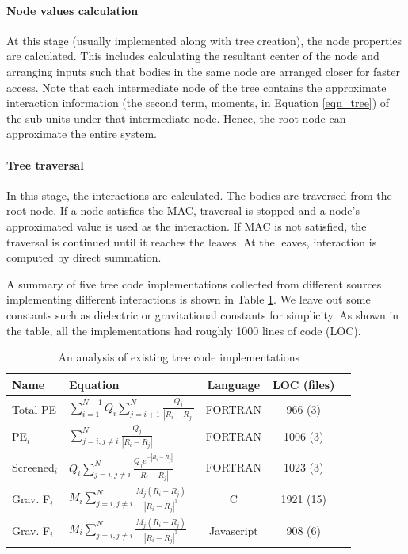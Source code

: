 \documentclass[draftclsnofoot]{elsarticle}
\begin{document}
\paragraph{Node values calculation}
At this stage (usually implemented along with tree creation), the node  properties are calculated. This includes calculating the resultant center of the node and arranging 
inputs such that bodies in the same node are arranged closer for faster access. Note that each intermediate node of the tree contains the approximate interaction 
information (the second term, moments, in Equation \ref{eqn_tree}) of the sub-units under that intermediate node.  Hence, the root node can approximate the entire system. 
 
\paragraph{Tree traversal}
In this stage, the interactions are calculated. The bodies are traversed from the root node. If a node satisfies the MAC, traversal is stopped and a node's approximated value
is used as the interaction. If MAC is not satisfied, the traversal is continued until it reaches the leaves. At the leaves, interaction is computed by direct summation.

A summary of five tree code implementations collected from different sources \cite{code1,code2, code3} implementing different
interactions is shown in  Table \ref{tbl_treecodes}. We leave out some constants such as dielectric or gravitational constants for simplicity.
As shown in the table, all the implementations had roughly 1000 lines of code (LOC).  

\begin{table}[!t]
\caption{An analysis of existing tree code implementations}
\label{tbl_treecodes}
\centering
\begin{tabular}{|l|l|c|c|c|}
\hline
Name & Equation & Language & LOC (files) \\
\hline \hline
Total PE
 & $\sum \limits_{i=1}^{N-1} Q_i\sum \limits_{j=i+1}^{N} \frac{Q_j}{|R_i-R_j|}$ & FORTRAN & 966 (3) \\
PE$_i$ &       $  \sum \limits_{j=i, j\ne i}^{N} \frac{Q_j}{|R_i-R_j|}$                              & FORTRAN & 1006 (3) \\
Screened$_i$ &    $Q_i\sum \limits_{j=i, j\ne i}^{N} \frac{Q_je^{-|R_i-R_j|}}{|R_i- R_j|}$ & FORTRAN & 1023 (3) \\
Grav. F$_i$
& $M_i\sum \limits_{j=i, j\ne i}^{N} \frac{M_j{(R_i- R_j)}}{{|R_i-R_j|}^3}$ & C & 1921 (15) \\
Grav. F$_i$
 & $M_i\sum \limits_{j=i, j\ne i}^{N} \frac{M_j{(R_i- R_j)}}{{|R_i-R_j|}^3}$ & Javascript & 908 (6) \\
\hline
\end{tabular}
\end{table}
\end{document}
